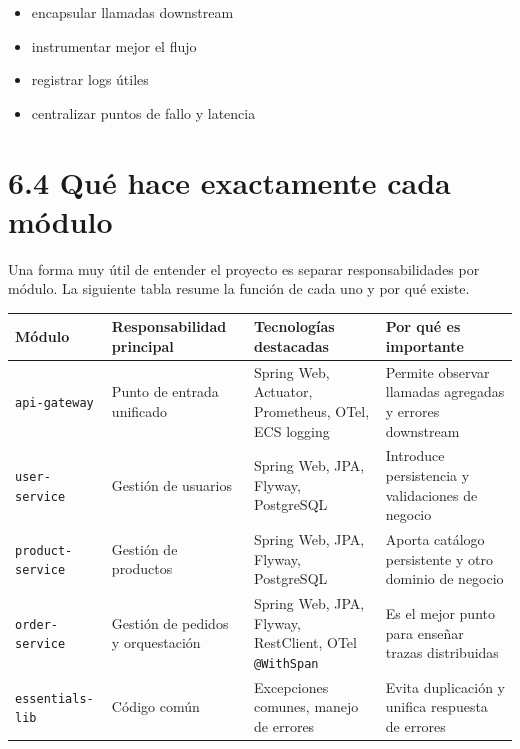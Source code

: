 \documentclass[
a4paper,
12pt]{report}
\providecommand{\tightlist}{%
  \setlength{\itemsep}{0pt}\setlength{\parskip}{0pt}}
\begin{document}
\begin{itemize}
\tightlist
\item
  encapsular llamadas downstream
\item
  instrumentar mejor el flujo
\item
  registrar logs útiles
\item
  centralizar puntos de fallo y latencia
\end{itemize}

\section{6.4 Qué hace exactamente cada
módulo}\label{quuxe9-hace-exactamente-cada-muxf3dulo}

Una forma muy útil de entender el proyecto es separar responsabilidades
por módulo. La siguiente tabla resume la función de cada uno y por qué
existe.

{\def\LTcaptype{table} %
\begin{longtable}[]{@{}
  >{\raggedright\arraybackslash}p{}
  >{\raggedright\arraybackslash}p{}
  >{\raggedright\arraybackslash}p{}
  >{\raggedright\arraybackslash}p{}@{}}
\toprule\noalign{}
\begin{minipage}[b]{\linewidth}\raggedright
Módulo
\end{minipage} & \begin{minipage}[b]{\linewidth}\raggedright
Responsabilidad principal
\end{minipage} & \begin{minipage}[b]{\linewidth}\raggedright
Tecnologías destacadas
\end{minipage} & \begin{minipage}[b]{\linewidth}\raggedright
Por qué es importante
\end{minipage} \\
\midrule\noalign{}
\endhead
\bottomrule\noalign{}
\endlastfoot
\texttt{api-gateway} & Punto de entrada unificado & Spring Web,
Actuator, Prometheus, OTel, ECS logging & Permite observar llamadas
agregadas y errores downstream \\
\texttt{user-service} & Gestión de usuarios & Spring Web, JPA, Flyway,
PostgreSQL & Introduce persistencia y validaciones de negocio \\
\texttt{product-service} & Gestión de productos & Spring Web, JPA,
Flyway, PostgreSQL & Aporta catálogo persistente y otro dominio de
negocio \\
\texttt{order-service} & Gestión de pedidos y orquestación & Spring Web,
JPA, Flyway, RestClient, OTel \texttt{@WithSpan} & Es el mejor punto
para enseñar trazas distribuidas \\
\texttt{essentials-lib} & Código común & Excepciones comunes, manejo de
errores & Evita duplicación y unifica respuesta de errores \\
\end{longtable}
}
\end{document}
